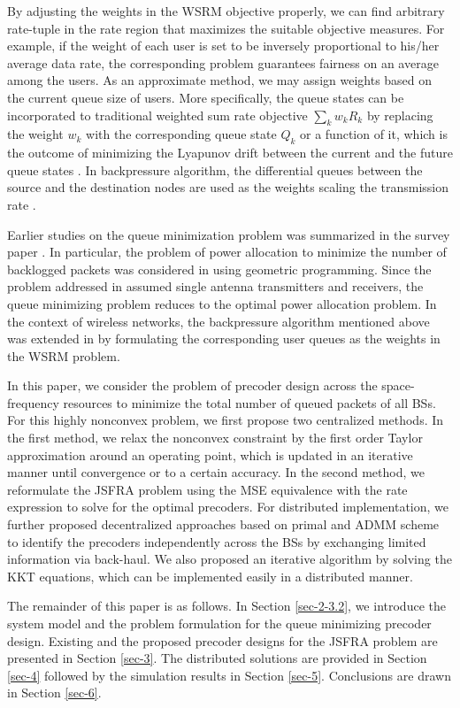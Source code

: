 By adjusting the weights in the \ac{WSRM} objective properly, we can find arbitrary rate-tuple in the rate region that maximizes the suitable objective measures. For example, if the weight of each user is set to be inversely proportional to his/her average data rate, the corresponding problem guarantees fairness on an average among the users. As an approximate method, we may assign weights based on the current queue size of users. More specifically, the queue states can be incorporated to traditional weighted sum rate objective $\sum_k w_k R_k$ by replacing the weight $w_k$ with the corresponding queue state $Q_k$ or a function of it,  which is the outcome of minimizing the Lyapunov drift between the current and the future queue states \cite{tassiulas,neely2010stochastic}. In backpressure algorithm, the differential queues between the source and the destination nodes are used as the weights scaling the transmission rate \cite{georgiadis2006resource}.

Earlier studies on the queue minimization problem was summarized in the survey paper \cite{berry2004cross}. In particular, the problem of power allocation to minimize the number of backlogged packets was considered in \cite{qps_cioffi} using geometric programming. Since the problem addressed in \cite{qps_cioffi} assumed single antenna transmitters and receivers, the queue minimizing problem reduces to the optimal power allocation problem. In the context of wireless networks, the backpressure algorithm mentioned above was extended in \cite{weeraddana2011resource} by formulating the corresponding user queues as the weights in the \ac{WSRM} problem.

In this paper, we consider the problem of precoder design across the space-frequency resources to minimize the total number of queued packets of all \acp{BS}. For this highly nonconvex problem, we first propose two centralized methods. In the first method, we relax the nonconvex constraint by the first order Taylor approximation around an operating point, which is updated in an iterative manner until convergence or to a certain accuracy. In the second method, we reformulate the \ac{JSFRA} problem using the \ac{MSE} equivalence with the rate expression to solve for the optimal precoders. For distributed implementation, we further proposed decentralized approaches based on primal and \ac{ADMM} scheme to identify the precoders independently across the \acp{BS} by exchanging limited information via back-haul. We also proposed an iterative algorithm by solving the \ac{KKT} equations, which can be implemented easily in a distributed manner.

The remainder of this paper is as follows. In Section \ref{sec-2-3.2}, we introduce the system model and the problem formulation for the queue minimizing precoder design. Existing and the proposed precoder designs for the \ac{JSFRA} problem are presented in Section \ref{sec-3}. The distributed solutions are provided in Section \ref{sec-4} followed by the simulation results in Section \ref{sec-5}. Conclusions are drawn in Section \ref{sec-6}.
